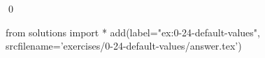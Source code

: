 
\begin{ex}
  \label{ex:0-24-default-values}
  
  \qed
\end{ex}
\begin{python0}
from solutions import *
add(label="ex:0-24-default-values",
    srcfilename='exercises/0-24-default-values/answer.tex')
\end{python0}
